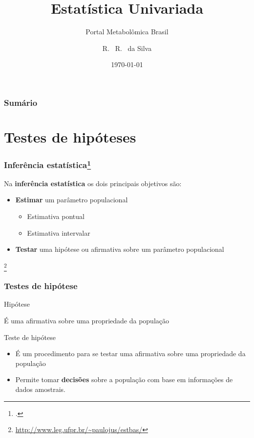 \documentclass{beamer}
\title[About Beamer] %
{Estatística Univariada}
\subtitle{Portal Metabolômica Brasil}
\author[Arthur, Doe] %
{R. ~R. ~da Silva\inst{1}}
\institute[VFU] %
{
  \inst{1}%
  Departamento de Ciências BioMoleculares\\
  Faculdade de Ciências Farmacêuticas

}
\date{\today} %
\newcommand\blfootnote[1]{%
  \begingroup
  \renewcommand\thefootnote{}\footnote{#1}%
  \addtocounter{footnote}{-1}%
  \endgroup
}
\begin{document}
\begin{frame}
\titlepage
\end{frame}

\begin{frame}
\label{contents}
\frametitle{Sumário}
\tableofcontents
\end{frame}



\section{Testes de hipóteses}
\begin{frame}
\frametitle{Inferência estatística\footcite{magalhaes2002noccoes}}

Na \textbf{inferência estatística} os dois principais objetivos são:

\begin{itemize}
\item
  \textbf{Estimar} um parâmetro populacional

  \begin{itemize}
  \item
    Estimativa pontual
  \item
    Estimativa intervalar
  \end{itemize}
\item
  \textbf{Testar} uma hipótese ou afirmativa sobre um parâmetro
  populacional
\end{itemize}
\blfootnote{\url{http://www.leg.ufpr.br/~paulojus/estbas/}}
\end{frame}

\begin{frame}
\frametitle{Testes de hipótese}

\begin{block}{Hipótese}

É uma afirmativa sobre uma propriedade da população

\end{block}

\begin{block}{Teste de hipótese}

\begin{itemize}
\item
  É um procedimento para se testar uma afirmativa sobre uma propriedade
  da população
\item
  Permite tomar \textbf{decisões} sobre a população com base em
  informações de dados amostrais.
\end{itemize}
\end{block}

\end{frame}
\end{document}
